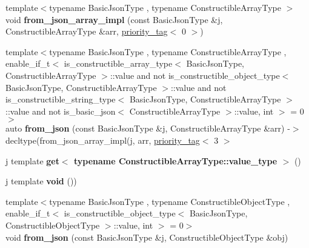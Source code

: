 \begin{DoxyCompactItemize}
\item 
\mbox{\label{namespacenlohmann_1_1detail_a20cf21255e75cff1ffb0869c2c545e63}} 
{\footnotesize template$<$typename Basic\+Json\+Type , typename Constructible\+Array\+Type $>$ }\\void {\bfseries from\+\_\+json\+\_\+array\+\_\+impl} (const Basic\+Json\+Type \&j, Constructible\+Array\+Type \&arr, \hyperlink{structnlohmann_1_1detail_1_1priority__tag}{priority\+\_\+tag}$<$ 0 $>$)
\item 
\mbox{\label{namespacenlohmann_1_1detail_a14d8cdf544585f1c38eab6a0820e55f7}} 
{\footnotesize template$<$typename Basic\+Json\+Type , typename Constructible\+Array\+Type , enable\+\_\+if\+\_\+t$<$ is\+\_\+constructible\+\_\+array\+\_\+type$<$ Basic\+Json\+Type, Constructible\+Array\+Type $>$\+::value and not is\+\_\+constructible\+\_\+object\+\_\+type$<$ Basic\+Json\+Type, Constructible\+Array\+Type $>$\+::value and not is\+\_\+constructible\+\_\+string\+\_\+type$<$ Basic\+Json\+Type, Constructible\+Array\+Type $>$\+::value and not is\+\_\+basic\+\_\+json$<$ Constructible\+Array\+Type $>$\+::value, int $>$  = 0$>$ }\\auto {\bfseries from\+\_\+json} (const Basic\+Json\+Type \&j, Constructible\+Array\+Type \&arr) -\/$>$ decltype(from\+\_\+json\+\_\+array\+\_\+impl(j, arr, \hyperlink{structnlohmann_1_1detail_1_1priority__tag}{priority\+\_\+tag}$<$ 3 $>$
\item 
\mbox{\label{namespacenlohmann_1_1detail_ad9e016d7b6a3cd2847027950aa0aac3b}} 
j template {\bfseries get$<$ typename Constructible\+Array\+Type\+::value\+\_\+type $>$} ()
\item 
\mbox{\label{namespacenlohmann_1_1detail_a59fca69799f6b9e366710cb9043aa77d}} 
j template {\bfseries void} ())
\item 
\mbox{\label{namespacenlohmann_1_1detail_a5b24896e5f5db6af06d939dde4b63fe1}} 
{\footnotesize template$<$typename Basic\+Json\+Type , typename Constructible\+Object\+Type , enable\+\_\+if\+\_\+t$<$ is\+\_\+constructible\+\_\+object\+\_\+type$<$ Basic\+Json\+Type, Constructible\+Object\+Type $>$\+::value, int $>$  = 0$>$ }\\void {\bfseries from\+\_\+json} (const Basic\+Json\+Type \&j, Constructible\+Object\+Type \&obj)

\end{DoxyCompactItemize}
